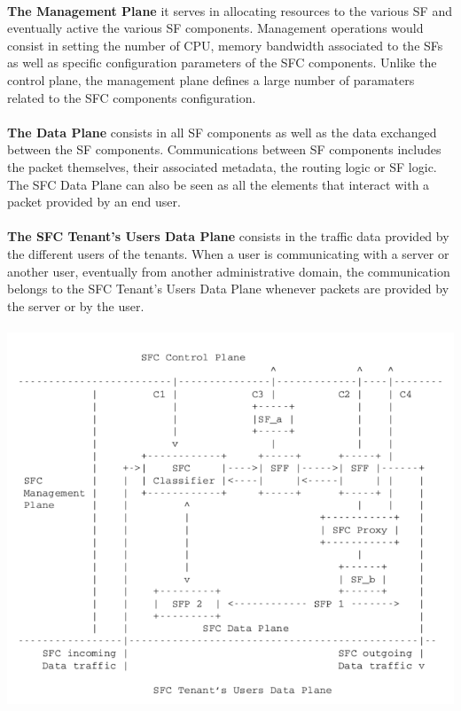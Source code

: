 \\
\textbf{The Management Plane} it serves in allocating resources to the various SF and eventually active the various SF components. Management operations would consist in setting the number of CPU, memory bandwidth associated to the SFs as well as specific configuration parameters of the SFC components. Unlike the control plane, the management plane defines a large number of paramaters related to the SFC components configuration.\\
\\
\textbf{The Data Plane} consists in all SF components as well as the data exchanged between the SF components. Communications between SF components includes the packet themselves, their associated metadata, the routing logic or SF
logic. The SFC Data Plane can also be seen as all the elements that interact with a packet provided by an end user.\\
\\
\textbf{The SFC Tenant’s Users Data Plane} consists in the traffic data provided by the different users of the tenants. When a user is communicating with a server or another user, eventually from another administrative domain, the communication belongs to
the SFC Tenant’s Users Data Plane whenever packets are provided by the server or by the user.\\
\\
\includegraphics[scale=0.45]{sfc1}
\\
\\
